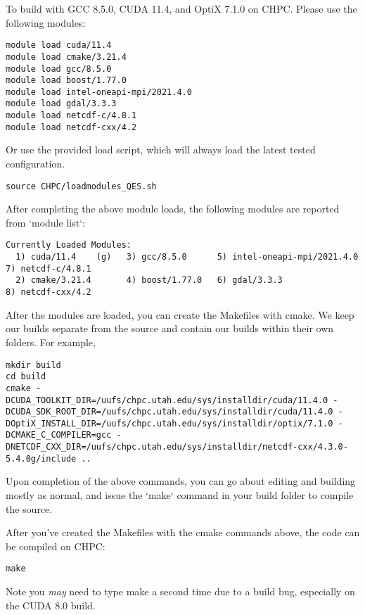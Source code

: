 To build with GCC 8.5.0, CUDA 11.4, and OptiX 7.1.0 on CHPC. Please use the following modules:
\begin{verbatim}
module load cuda/11.4
module load cmake/3.21.4
module load gcc/8.5.0
module load boost/1.77.0
module load intel-oneapi-mpi/2021.4.0
module load gdal/3.3.3
module load netcdf-c/4.8.1
module load netcdf-cxx/4.2
\end{verbatim}
Or use the provided load script, which will always load the latest tested configuration.
\begin{verbatim}
source CHPC/loadmodules_QES.sh
\end{verbatim}
After completing the above module loads, the following modules are reported from `module list`:
\begin{verbatim}
Currently Loaded Modules:
  1) cuda/11.4    (g)   3) gcc/8.5.0      5) intel-oneapi-mpi/2021.4.0   7) netcdf-c/4.8.1
  2) cmake/3.21.4       4) boost/1.77.0   6) gdal/3.3.3                  8) netcdf-cxx/4.2
\end{verbatim}
After the modules are loaded, you can create the Makefiles with cmake.  We keep our builds separate from the source and contain our builds within their own folders.  For example, 
\begin{verbatim}
mkdir build
cd build
cmake -DCUDA_TOOLKIT_DIR=/uufs/chpc.utah.edu/sys/installdir/cuda/11.4.0 -DCUDA_SDK_ROOT_DIR=/uufs/chpc.utah.edu/sys/installdir/cuda/11.4.0 -DOptiX_INSTALL_DIR=/uufs/chpc.utah.edu/sys/installdir/optix/7.1.0 -DCMAKE_C_COMPILER=gcc -DNETCDF_CXX_DIR=/uufs/chpc.utah.edu/sys/installdir/netcdf-cxx/4.3.0-5.4.0g/include ..
\end{verbatim}
Upon completion of the above commands, you can go about editing and building mostly as normal, and issue the `make` command in your build folder to compile the source.

After you've created the Makefiles with the cmake commands above, the code can be compiled on CHPC:
\begin{verbatim}
make
\end{verbatim}
Note you \textit{may} need to type make a second time due to a build bug, especially on the CUDA 8.0 build.
